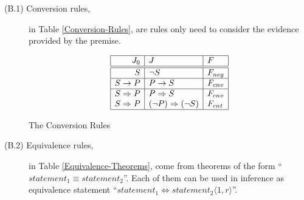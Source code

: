 \begin{description}
	\item[(B.1) Conversion rules,] in Table \ref{Conversion-Rules}, are rules only need to consider the evidence provided by the premise.

\begin{table}[htb]
\[\begin{array}{|r|l|l|} \hline
 J_0 & J & F \\
\hline \hline
 S & \neg S & F_{neg} \\
\hline
 S \rightarrow P & P \rightarrow S & F_{cnv} \\
\hline
 S \Rightarrow P & P \Rightarrow S & F_{cnv} \\
 S \Rightarrow P & (\neg P) \Rightarrow (\neg S) & F_{cnt} \\
\hline
\end{array}\]
\caption{The Conversion Rules}
\label{Conversion-Rules}
\end{table}

  \item[(B.2) Equivalence rules,] in Table \ref{Equivalence-Theorems}, come from theorems of the form ``\(statement_1 \equiv statement_2\)''. Each of them can be used in inference as equivalence statement ``\(statement_1 \Leftrightarrow statement_2 \langle 1, r\rangle \)''.


\end{description}
